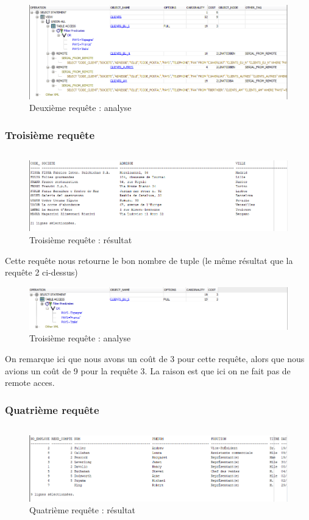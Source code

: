 \documentclass[10pt,a4paper]{article}
\theoremstyle{plain}
\begin{document}
\begin{figure}[H]
    \centering
    \includegraphics[width=15cm]{EUS_req2_analyse.PNG}
    \caption{Deuxième requête : analyse}
\end{figure}
\newpage

\subsubsection{Troisième requête}
\inputminted{sql}{EUS_IV-A-3.sql}
\begin{figure}[H]
    \centering
    \includegraphics[width=15cm]{EUS_req3.PNG}
    \caption{Troisième requête : résultat}
\end{figure}
Cette requête nous retourne le bon nombre de tuple (le même résultat que la requête 2 ci-dessus)

\begin{figure}[H]
    \centering
    \includegraphics[width=15cm]{EUS_req3_analyse.PNG}
    \caption{Troisième requête : analyse}
\end{figure}
On remarque ici que nous avons un coût de 3 pour cette requête, alors que nous avions un coût de 9 pour la requête 3. La raison est que ici on ne fait pas de remote acces.
\newpage

\subsubsection{Quatrième requête}
\inputminted{sql}{EUS_IV-A-4.sql}
\begin{figure}[H]
    \centering
    \includegraphics[width=15cm]{EUS_req4.PNG}
    \caption{Quatrième requête : résultat}
\end{figure}
\end{document}
